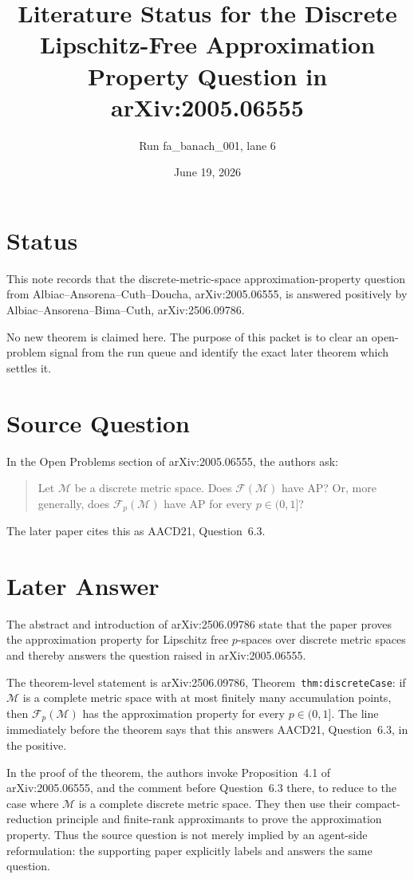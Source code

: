 \documentclass[11pt]{article}
\title{Literature Status for the Discrete Lipschitz-Free Approximation Property Question in arXiv:2005.06555}
\author{Run fa\_banach\_001, lane 6}
\date{June 19, 2026}
\newcommand{\Fp}{\mathcal F_p}
\newcommand{\F}{\mathcal F}
\newcommand{\M}{\mathcal M}
\begin{document}
\maketitle

\section*{Status}

This note records that the discrete-metric-space approximation-property
question from Albiac--Ansorena--Cuth--Doucha, arXiv:2005.06555, is answered
positively by Albiac--Ansorena--Bima--Cuth, arXiv:2506.09786.

No new theorem is claimed here. The purpose of this packet is to clear an
open-problem signal from the run queue and identify the exact later theorem
which settles it.

\section*{Source Question}

In the Open Problems section of arXiv:2005.06555, the authors ask:
\begin{quote}
Let $\M$ be a discrete metric space. Does $\F(\M)$ have AP? Or, more
generally, does $\Fp(\M)$ have AP for every $p\in(0,1]$?
\end{quote}
The later paper cites this as AACD21, Question~6.3.

\section*{Later Answer}

The abstract and introduction of arXiv:2506.09786 state that the paper proves
the approximation property for Lipschitz free $p$-spaces over discrete metric
spaces and thereby answers the question raised in arXiv:2005.06555.

The theorem-level statement is arXiv:2506.09786, Theorem~\texttt{thm:discreteCase}:
if $\M$ is a complete metric space with at most finitely many accumulation
points, then $\Fp(\M)$ has the approximation property for every $p\in(0,1]$.
The line immediately before the theorem says that this answers
AACD21, Question~6.3, in the positive.

In the proof of the theorem, the authors invoke Proposition~4.1 of
arXiv:2005.06555, and the comment before Question~6.3 there, to reduce to the
case where $\M$ is a complete discrete metric space. They then use their
compact-reduction principle and finite-rank approximants to prove the
approximation property. Thus the source question is not merely implied by an
agent-side reformulation: the supporting paper explicitly labels and answers
the same question.
\end{document}
